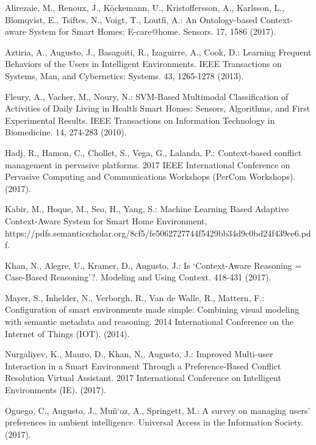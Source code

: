 \documentclass{llncs}
\begin{document}
    \begin{thebibliography}{1}
        Alirezaie, M., Renoux, J., Köckemann, U., Kristoffersson, A., Karlsson, L., Blomqvist, E., Tsiftes, N., Voigt, T., Loutfi, A.: An Ontology-based Context-aware System for Smart Homes: E-care@home. Sensors. 17, 1586 (2017).

        Aztiria, A., Augusto, J., Basagoiti, R., Izaguirre, A., Cook, D.: Learning Frequent Behaviors of the Users in Intelligent Environments. IEEE Transactions on Systems, Man, and Cybernetics: Systems. 43, 1265-1278 (2013).

        Fleury, A., Vacher, M., Noury, N.: SVM-Based Multimodal Classification of Activities of Daily Living in Health Smart Homes: Sensors, Algorithms, and First Experimental Results. IEEE Transactions on Information Technology in Biomedicine. 14, 274-283 (2010).

        Hadj, R., Hamon, C., Chollet, S., Vega, G., Lalanda, P.: Context-based conflict management in pervasive platforms. 2017 IEEE International Conference on Pervasive Computing and Communications Workshops (PerCom Workshops). (2017).

        Kabir, M., Hoque, M., Seo, H., Yang, S.: Machine Learning Based Adaptive Context-Aware System for Smart Home Environment, https://pdfs.semanticscholar.org/8cf5/fe5062727744f5429bb34d9c0bd24f439ee6.pdf.

        Khan, N., Alegre, U., Kramer, D., Augusto, J.: Is ‘Context-Aware Reasoning = Case-Based Reasoning’?. Modeling and Using Context. 418-431 (2017).

        Mayer, S., Inhelder, N., Verborgh, R., Van de Walle, R., Mattern, F.: Configuration of smart environments made simple: Combining visual modeling with semantic metadata and reasoning. 2014 International Conference on the Internet of Things (IOT). (2014).

        Nurgaliyev, K., Mauro, D., Khan, N., Augusto, J.: Improved Multi-user Interaction in a Smart Environment Through a Preference-Based Conflict Resolution Virtual Assistant. 2017 International Conference on Intelligent Environments (IE). (2017).

        Oguego, C., Augusto, J., Muñ`oz, A., Springett, M.: A survey on managing users’ preferences in ambient intelligence. Universal Access in the Information Society. (2017).


\end{thebibliography}
\end{document}
